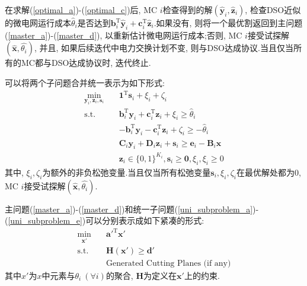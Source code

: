 \documentclass{article}
\begin{document}
在求解(\ref{optimal_a})-(\ref{optimal_c})后, MC $i$检查得到的解$(\hat{\mathbf{y}}_i, \hat{\mathbf{z}}_i)$, 检查DSO近似的微电网运行成本$\hat{\theta}_i$是否达到$\mathbf{b}_{i}^{\mathrm{T}}\hat{\mathbf{y}}_{i}+\mathbf{c}_{i}^{\mathrm{T}}\hat{\mathbf{z}}_{i}$.如果没有, 则将一个最优割返回到主问题(\ref{master_a})-(\ref{master_d}), 以重新估计微电网运行成本;否则, MC $i$接受试探解$(\hat{\mathbf{x}}, \hat{\theta_i})$, 并且, 如果后续迭代中电力交换计划不变, 则与DSO达成协议.当且仅当所有的MC都与DSO达成协议时, 迭代终止.

可以将两个子问题合并统一表示为如下形式:
\begin{subequations}
    \begin{align}
        \min_{\mathbf{y}_i, \mathbf{z}_i, \mathbf{s}_i}\quad& \mathbf{1}^{\mathrm{T}}\mathbf{s}_{i}+\xi_{i}+\zeta_{i} \label{uni_subproblem_a} \\
        \mathrm{s.t.}\quad&\mathbf{b}_{i}^{\mathrm{T}}\mathbf{y}_{i}+\mathbf{c}_{i}^{\mathrm{T}}\mathbf{z}_{i}+\xi_{i}\geq\hat{\theta}_{i} \label{uni_subproblem_b} \\
        &-\mathbf{b}_i^\mathrm{T}\mathbf{y}_i-\mathbf{c}_i^\mathrm{T}\mathbf{z}_i+\zeta_i\geq-\hat{\theta}_i \label{uni_subproblem_c} \\
        &\mathbf{C}_i\mathbf{y}_i+\mathbf{D}_i\mathbf{z}_i+\mathbf{s}_i\geq\mathbf{e}_i-\mathbf{B}_i\hat{\mathbf{x}} \label{uni_subproblem_d} \\
        &\mathbf{z}_{i}\in\{0, 1\}^{K_{i}}, \mathbf{s}_{i}\geq\mathbf{0}, \xi_{i}, \xi_{i}\geq 0 \label{uni_subproblem_e}
    \end{align}
\end{subequations}
其中, $\xi_i, \zeta_i$为额外的非负松弛变量.当且仅当所有松弛变量$\mathbf{s}_i, \xi_i, \zeta_i$在最优解处都为$0$, MC $i$接受试探解$(\hat{\mathbf{x}}, \hat{\theta_i})$.

主问题(\ref{master_a})-(\ref{master_d})和统一子问题(\ref{uni_subproblem_a})-(\ref{uni_subproblem_e})可以分别表示成如下紧凑的形式:
\begin{subequations}
    \begin{align}
        \min_{\mathbf{x'}}\quad&\mathbf{a'}^{\mathrm{T}}\mathbf{x'} \label{compact_master_a} \\
        \mathrm{s.t.}\quad&\mathbf{H}(\mathbf{x'})\geq\mathbf{d'} \label{compact_master_b} \\
        &\text{Generated Cutting Planes (if any)} \label{compact_master_c}
    \end{align}
\end{subequations}
其中$x'$为$x$中元素与$\theta_i ~ (\forall i)$的聚合, $\mathbf{H}$为定义在$\mathbf{x'}$上的约束.
\end{document}
